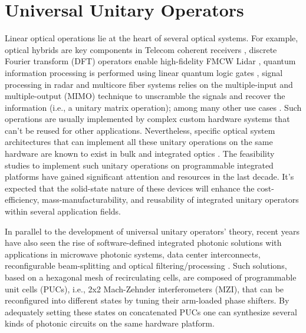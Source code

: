 
\chapter{Universal Unitary Operators}\label{chap:universal_unitary_operators} %

Linear optical operations lie at the heart of several optical systems.
For example, optical hybrids are key components in Telecom coherent receivers \cite{faralli_compact_2015}, discrete Fourier transform (DFT) operators enable high-fidelity FMCW Lidar \cite{kim_fmcw_2020}, quantum information processing is performed using linear quantum logic gates \cite{arrazola_quantum_2021,harris_large-scale_2016}, signal processing in radar \cite{sanchez-jacome_coherent_2021} and multicore fiber systems \cite{sakamoto_strongly-coupled_2017} relies on the multiple-input and multiple-output (MIMO) technique to unscramble the signals and recover the information (i.e., a unitary matrix operation); among many other use cases \cite{carolan_universal_2015}.
Such operations are usually implemented by complex custom hardware systems that can't be reused for other applications.
Nevertheless, specific optical system architectures that can implement all these unitary operations on the same hardware are known to exist in bulk and integrated optics \cite{clements_optimal_2016}.
The feasibility studies to implement such unitary operations on programmable integrated platforms have gained significant attention and resources in the last decade.
It's expected that the solid-state nature of these devices will enhance the cost-efficiency, mass-manufacturability, and reusability of integrated unitary operators within several application fields.

In parallel to the development of universal unitary operators' theory, recent years have also seen the rise of software-defined integrated photonic solutions with applications in microwave photonic systems, data center interconnects, reconfigurable beam-splitting and optical filtering/processing \cite{perez-lopez_general-purpose_2024}.
Such solutions, based on a hexagonal mesh of recirculating cells, are composed of programmable unit cells (PUCs), i.e., 2x2 Mach-Zehnder interferometers (MZI), that can be reconfigured into different states by tuning their arm-loaded phase shifters.
By adequately setting these states on concatenated PUCs one can synthesize several kinds of photonic circuits on the same hardware platform.

